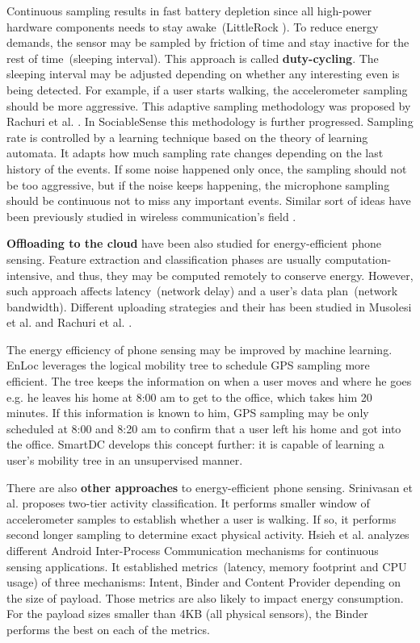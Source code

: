 Continuous sampling results in fast battery depletion since all high-power hardware components needs to stay awake\ (LittleRock \cite{priyantha:littlerock}). To reduce energy demands, the sensor may be sampled by friction of time and stay inactive for the rest of time\ (sleeping interval). This approach is called \textbf{duty-cycling}. The sleeping interval may be adjusted depending on whether any interesting even is being detected. For example, if a user starts walking, the accelerometer sampling should be more aggressive. This adaptive sampling methodology was proposed by Rachuri et al. \cite{rachuri:dynamicsensing}. In SociableSense\cite{rachuri:socialsense} this methodology is further progressed. Sampling rate is controlled by a learning technique based on the theory of learning automata. It adapts how much sampling rate changes depending on the last history of the events. If some noise happened only once, the sampling should not be too aggressive, but if the noise keeps happening, the microphone sampling should be continuous not to miss any important events. Similar sort of ideas have been previously studied in wireless communication's field \cite{deshpande:channeling} \cite{deshpande:refocusing} \cite{deshpande:coordinated}.

\textbf{Offloading to the cloud} have been also studied for energy-efficient phone sensing. Feature extraction and classification phases are usually computation-intensive, and thus, they may be computed remotely to conserve energy. However, such approach affects latency\ (network delay) and  a user's data plan\ (network bandwidth). Different uploading strategies and their has been studied in Musolesi et al. \cite{musolesi:offloading} and Rachuri et al. \cite{rachuri:socialsense}.

The energy efficiency of phone sensing may be improved by machine learning. EnLoc \cite{constandache:enloc} leverages the logical mobility tree to schedule GPS sampling more efficient. The tree keeps the information on when a user moves and where he goes e.g. he leaves his home at 8:00 am to get to the office, which takes him 20 minutes.  If this information is known to him, GPS sampling may be only scheduled at 8:00 and 8:20 am to confirm that a user left his home and got into the office. SmartDC \cite{chon:smartdc} develops this concept further: it is capable of learning a user's mobility tree in an unsupervised manner.

There are also \textbf{other approaches} to energy-efficient phone sensing. Srinivasan et al. \cite{srinivasan:twotier} proposes two-tier activity classification. It performs smaller window of accelerometer samples to establish whether a user is walking. If  so, it performs second longer sampling to determine exact physical activity. Hsieh et al. \cite{hsieh:ipc} analyzes different Android Inter-Process Communication mechanisms for continuous sensing applications. It established metrics\ (latency, memory footprint and CPU usage) of three mechanisms: Intent, Binder and Content Provider depending on the size of payload. Those metrics are also likely to impact energy consumption. For the payload sizes smaller than 4KB (all physical sensors), the Binder performs the best on each of the metrics.

